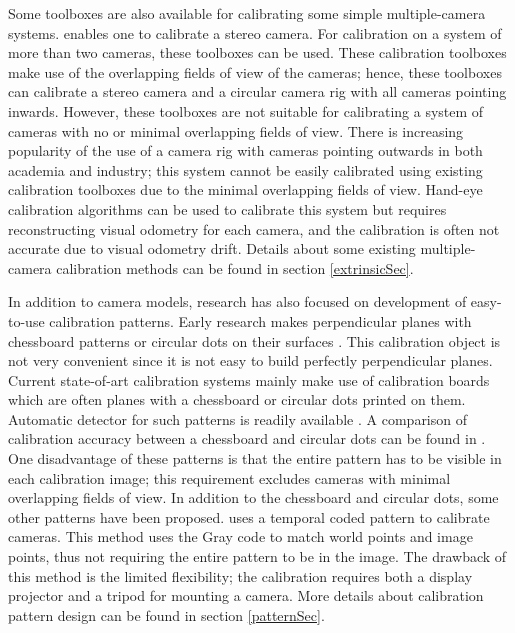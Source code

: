 \documentclass{report}
\begin{document}
Some toolboxes are also available for calibrating some simple multiple-camera systems. \cite{bouguet2004camera, opencv_library} enables one to calibrate a stereo camera. For calibration on a system of more than two cameras, these toolboxes \cite{svoboda2005convenient,easycal} can be used. These calibration toolboxes make use of the overlapping fields of view of the cameras; hence, these toolboxes can calibrate a stereo camera and a circular camera rig with all cameras pointing inwards. However, these toolboxes are not suitable for calibrating a system of cameras with no or minimal overlapping fields of view. There is increasing popularity of the use of a camera rig with cameras pointing outwards in both academia and industry; this system cannot be easily calibrated using existing calibration toolboxes due to the minimal overlapping fields of view. Hand-eye calibration algorithms \cite{tsai1989new,shiu1989calibration} can be used to calibrate this system but requires reconstructing visual odometry for each camera, and the calibration is often not accurate due to visual odometry drift. Details about some existing multiple-camera calibration methods can be found in section \ref{extrinsicSec}. 

In addition to camera models, research has also focused on development of easy-to-use calibration patterns. Early research makes perpendicular planes with chessboard patterns or circular dots on their surfaces \cite{bouguet2004camera}. This calibration object is not very convenient since it is not easy to build perfectly perpendicular planes. Current state-of-art calibration systems mainly make use of calibration boards which are often planes with a chessboard or circular dots printed on them. Automatic detector for such patterns is readily available \cite{opencv_library, rufli2008automatic, geiger2012automatic}. A comparison of calibration accuracy between a chessboard and circular dots can be found in \cite{mallon2007pattern}. One disadvantage of these patterns is that the entire pattern has to be visible in each calibration image; this requirement excludes cameras with minimal overlapping fields of view. In addition to the chessboard and circular dots, some other patterns have been proposed. \cite{schmalz2011camera} uses a temporal coded pattern to calibrate cameras. This method uses the Gray code to match world points and image points, thus not requiring the entire pattern to be in the image. The drawback of this method is the limited flexibility; the calibration requires both a display projector and a tripod for mounting a camera. More details about calibration pattern design can be found in section \ref{patternSec}. 
\end{document}
